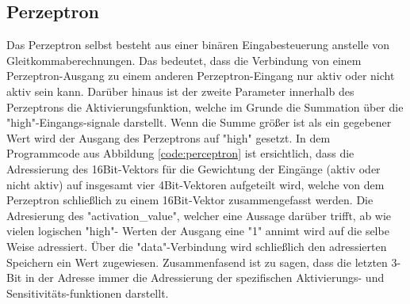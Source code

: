 \documentclass{article}
\numberwithin{equation}{section}
\begin{document}
\subsection{Perzeptron}
Das Perzeptron selbst besteht aus einer binären Eingabesteuerung anstelle von 
Gleitkommaberechnungen. Das bedeutet, dass die Verbindung von einem Perzeptron-Ausgang zu 
einem anderen Perzeptron-Eingang nur aktiv oder nicht aktiv sein kann.
Darüber hinaus ist der zweite Parameter innerhalb des Perzeptrons die Aktivierungsfunktion,
welche im Grunde die Summation über die "high"-Eingangs-signale darstellt.
Wenn die Summe größer ist als ein gegebener Wert wird der Ausgang des Perzeptrons auf 
"high" gesetzt. In dem Programmcode aus Abbildung \ref{code:perceptron} ist ersichtlich, 
dass die Adressierung des 16Bit-Vektors für die Gewichtung der Eingänge (aktiv oder nicht 
aktiv) auf insgesamt vier 4Bit-Vektoren aufgeteilt wird, welche von dem Perzeptron 
schließlich zu einem 16Bit-Vektor zusammengefasst werden. Die Adresierung des 
"activation\_value", welcher eine Aussage darüber trifft, ab wie vielen logischen "high"-
Werten der Ausgang eine "1" annimt wird auf die selbe Weise adressiert. Über die 
"data"-Verbindung wird schließlich den adressierten Speichern ein Wert zugewiesen.
Zusammenfasend ist zu sagen, dass die letzten 3-Bit in der Adresse immer die Adressierung 
der spezifischen Aktivierungs- und Sensitivitäts-funktionen darstellt.
\end{document}
